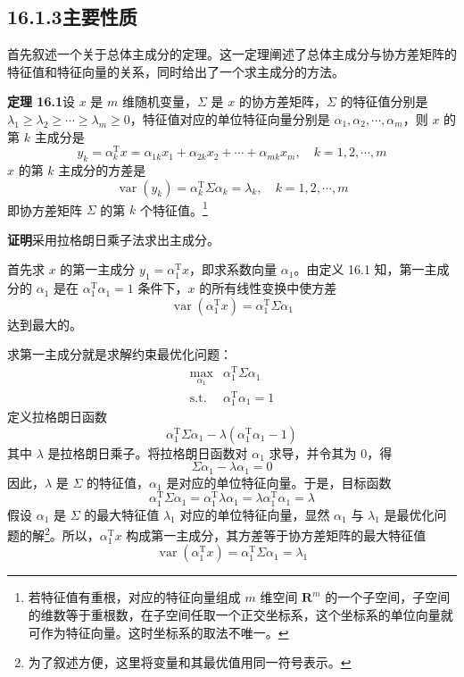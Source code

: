 \documentclass[UTF8, 12pt, fontset=fandol, oneside]{ctexart}
\begin{document}
\subsection*{16.1.3\quad 主要性质}

首先叙述一个关于总体主成分的定理。这一定理阐述了总体主成分与协方差矩阵的特征值和特征向量的关系，同时给出了一个求主成分的方法。

\noindent\textbf{定理 16.1}\quad 设 $x$ 是 $m$ 维随机变量，$\Sigma$ 是 $x$ 的协方差矩阵，$\Sigma$ 的特征值分别是 $\lambda_1\geqslant\lambda_2\geqslant\cdots\geqslant\lambda_m\geqslant 0$，特征值对应的单位特征向量分别是 $\alpha_1,\alpha_2,\cdots,\alpha_m$，则 $x$ 的第 $k$ 主成分是
\begin{equation}
y_k=\alpha_k^{\mathrm{T}}x=\alpha_{1k}x_1+\alpha_{2k}x_2+\cdots+\alpha_{mk}x_m,\quad k=1,2,\cdots,m
\tag{16.5}
\end{equation}
$x$ 的第 $k$ 主成分的方差是
\begin{equation}
\operatorname{var}(y_k)=\alpha_k^{\mathrm{T}}\Sigma\alpha_k=\lambda_k,\quad k=1,2,\cdots,m
\tag{16.6}
\end{equation}
即协方差矩阵 $\Sigma$ 的第 $k$ 个特征值。\footnote{若特征值有重根，对应的特征向量组成 $m$ 维空间 $\mathbf{R}^m$ 的一个子空间，子空间的维数等于重根数，在子空间任取一个正交坐标系，这个坐标系的单位向量就可作为特征向量。这时坐标系的取法不唯一。}

\noindent\textbf{证明}\quad 采用拉格朗日乘子法求出主成分。

首先求 $x$ 的第一主成分 $y_1=\alpha_1^{\mathrm{T}}x$，即求系数向量 $\alpha_1$。由定义 16.1 知，第一主成分的 $\alpha_1$ 是在 $\alpha_1^{\mathrm{T}}\alpha_1=1$ 条件下，$x$ 的所有线性变换中使方差
\[
\operatorname{var}(\alpha_1^{\mathrm{T}}x)=\alpha_1^{\mathrm{T}}\Sigma\alpha_1
\]
达到最大的。

求第一主成分就是求解约束最优化问题：
\begin{equation}
\begin{array}{ll}
\displaystyle\max_{\alpha_1} & \alpha_1^{\mathrm{T}}\Sigma\alpha_1\\[0.4em]
\mathrm{s.t.} & \alpha_1^{\mathrm{T}}\alpha_1=1
\end{array}
\tag{16.7}
\end{equation}
定义拉格朗日函数
\[
\alpha_1^{\mathrm{T}}\Sigma\alpha_1-\lambda(\alpha_1^{\mathrm{T}}\alpha_1-1)
\]
其中 $\lambda$ 是拉格朗日乘子。将拉格朗日函数对 $\alpha_1$ 求导，并令其为 0，得
\[
\Sigma\alpha_1-\lambda\alpha_1=0
\]
因此，$\lambda$ 是 $\Sigma$ 的特征值，$\alpha_1$ 是对应的单位特征向量。于是，目标函数
\[
\alpha_1^{\mathrm{T}}\Sigma\alpha_1=\alpha_1^{\mathrm{T}}\lambda\alpha_1=\lambda\alpha_1^{\mathrm{T}}\alpha_1=\lambda
\]
假设 $\alpha_1$ 是 $\Sigma$ 的最大特征值 $\lambda_1$ 对应的单位特征向量，显然 $\alpha_1$ 与 $\lambda_1$ 是最优化问题的解\footnote{为了叙述方便，这里将变量和其最优值用同一符号表示。}。所以，$\alpha_1^{\mathrm{T}}x$ 构成第一主成分，其方差等于协方差矩阵的最大特征值
\begin{equation}
\operatorname{var}(\alpha_1^{\mathrm{T}}x)=\alpha_1^{\mathrm{T}}\Sigma\alpha_1=\lambda_1
\tag{16.8}
\end{equation}
\end{document}
